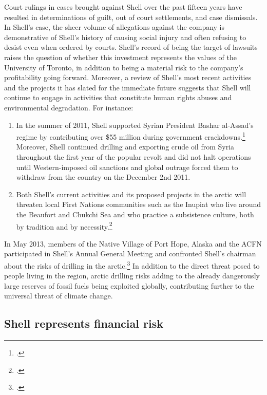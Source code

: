 \documentclass[10pt]{article}
\begin{document}
	
Court rulings in cases brought against Shell over the past fifteen years have resulted in determinations of guilt, out of court settlements, and case dismissals. 
In Shell's case, the sheer volume of allegations against the company is demonstrative of Shell's history of causing social injury and often refusing to desist even when ordered by courts.
Shell's record of being the target of lawsuits raises the question of whether this investment represents the values of the University of Toronto, in addition to being a material risk to the company's profitability going forward.
Moreover, a review of Shell's most recent activities and the projects it has slated for the immediate future suggests that Shell will continue to engage in activities that constitute human rights abuses and environmental degradation.
For instance:
\begin{enumerate}
	\item In the summer of 2011, Shell supported Syrian President Bashar al-Assad's regime by contributing over \$55 million during government crackdowns.\footcite[][]{Syria_2011} Moreover, Shell continued drilling and exporting crude oil from Syria throughout the first year of the popular revolt and did not halt operations until Western-imposed oil sanctions and global outrage forced them to withdraw from the country on the December 2nd 2011.
	\item Both Shell's current activities and its proposed projects in the arctic will threaten local First Nations communities such as the Inupiat who live around the Beaufort and Chukchi Sea and who practice a subsistence culture, both by tradition and by necessity.\footcite[][p. 13]{RiskingRuin_2012}
\end{enumerate}
In May 2013, members of the Native Village of Port Hope, Alaska and the ACFN participated in Shell's Annual General Meeting and confronted Shell's chairman about the risks of drilling in the arctic.\footcite{ShellArcticOilRush}
In addition to the direct threat posed to people living in the region, arctic drilling risks adding to the already dangerously large reserves of fossil fuels being exploited globally, contributing further to the universal threat of climate change.



	\subsection{Shell represents financial risk}
	
\end{document}
